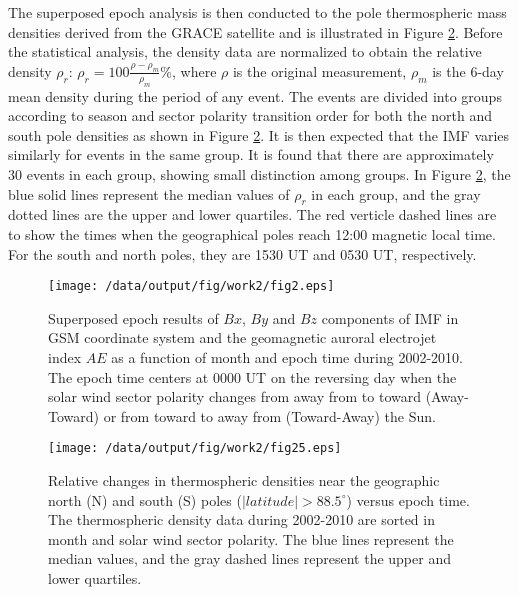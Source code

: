 \documentclass[draft,grl]{/home/gdj/文档/template/agu_template/AGUTeX}
\begin{document}
\begin{article}
    The superposed epoch analysis is then conducted to the pole thermospheric mass densities derived from the 
    GRACE satellite and is illustrated in Figure \ref{figure2}.
    Before the statistical analysis, the density data are normalized to obtain the relative  density $\rho_r$:
    $\rho_r=100\frac{\rho-\rho_m}{\rho_m}\%$, where $\rho$ is the original measurement, 
    $\rho_m$ is the 6-day mean density during the period of any event.
    The events are divided into groups according to season and sector polarity transition order for
    both the north and south pole densities as shown in Figure \ref{figure2}.
    It is then expected that the IMF varies similarly for events in the same group.
    It is found that there are approximately 30 events in each group, showing small distinction among groups.
    In Figure \ref{figure2}, the blue solid lines represent the median values of $\rho_r$ in 
    each group, and the gray dotted lines are the upper and lower quartiles. 
    The red verticle dashed lines are to show the times when the geographical poles reach 12:00 magnetic
    local time. 
    For the south and north poles, they are 1530 UT and 0530 UT, respectively.


\end{article}
\begin{figure}
    \centering
    \noindent\texttt{[image: /data/output/fig/work2/fig2.eps]}
    \caption{Superposed epoch results of $Bx$, $By$ and $Bz$ components of IMF in GSM coordinate system and the
    geomagnetic auroral electrojet index $AE$ as a function of month and epoch time during 2002-2010. The epoch 
    time centers at 0000 UT on the reversing day when the solar wind sector polarity changes from away from to 
    toward (Away-Toward) or from toward to away from (Toward-Away) the Sun. }
    \label{figure1}
\end{figure}
\begin{figure}
    \centering
    \noindent\texttt{[image: /data/output/fig/work2/fig25.eps]}
    \caption{Relative changes in thermospheric densities near the geographic north (N) and south (S) poles 
    ($\left|latitude\right| > 88.5^\circ$) versus epoch time. The thermospheric density data during 2002-2010 
    are sorted in month and solar wind sector polarity. The blue lines represent the median values, and the 
    gray dashed lines represent the upper and lower quartiles.}
    \label{figure2}
\end{figure}
\end{document}
